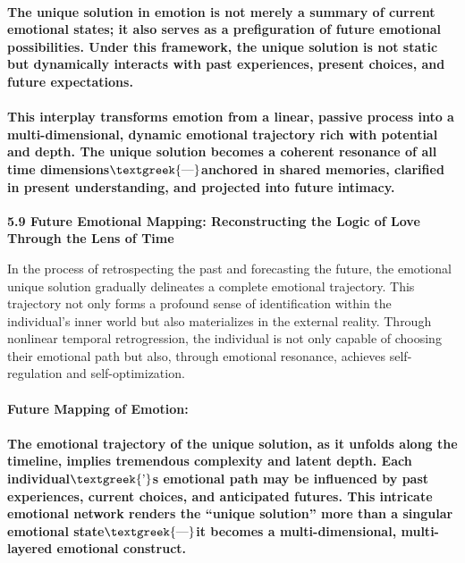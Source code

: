 \documentclass[a4paper]{article}
\begin{document}
\paragraph{The unique solution in emotion is not merely a summary of current emotional states; it also serves as a
prefiguration of future emotional possibilities. Under this framework, the unique solution is not static but
dynamically interacts with past experiences, present choices, and future expectations. }
\paragraph[This interplay transforms emotion from a linear, passive process into a multi{}-dimensional, dynamic
emotional trajectory rich with potential and depth. The unique solution becomes a coherent resonance of all time
dimensions$\text{\textgreek{—}}$anchored in shared memories, clarified in present understanding, and projected into
future intimacy.]{This interplay transforms emotion from a linear, passive process into a multi-dimensional, dynamic
emotional trajectory rich with potential and depth. The unique solution becomes a coherent resonance of all time
dimensions$\text{\textgreek{—}}$anchored in shared memories, clarified in present understanding, and projected into
future intimacy.}
\textbf{5.9 Future Emotional Mapping: Reconstructing the Logic of Love Through the Lens of Time}

In the process of retrospecting the past and forecasting the future, the emotional unique solution gradually delineates
a complete emotional trajectory. This trajectory not only forms a profound sense of identification within the
individual's inner world but also materializes in the external reality. Through nonlinear temporal retrogression, the
individual is not only capable of choosing their emotional path but also, through emotional resonance, achieves
self-regulation and self-optimization.

\paragraph[Future Mapping of Emotion:]{\textbf{Future Mapping of Emotion:}}
\paragraph[The emotional trajectory of the unique solution, as it unfolds along the timeline, implies tremendous
complexity and latent depth. Each individual$\text{\textgreek{’}}$s emotional path may be influenced by past
experiences, current choices, and anticipated futures. This intricate emotional network renders the “unique solution”
more than a singular emotional state$\text{\textgreek{—}}$it becomes a multi{}-dimensional, multi{}-layered emotional
construct.]{The emotional trajectory of the unique solution, as it unfolds along the timeline, implies tremendous
complexity and latent depth. Each individual$\text{\textgreek{’}}$s emotional path may be influenced by past
experiences, current choices, and anticipated futures. This intricate emotional network renders the “unique solution”
more than a singular emotional state$\text{\textgreek{—}}$it becomes a multi-dimensional, multi-layered emotional
construct.}
\end{document}
